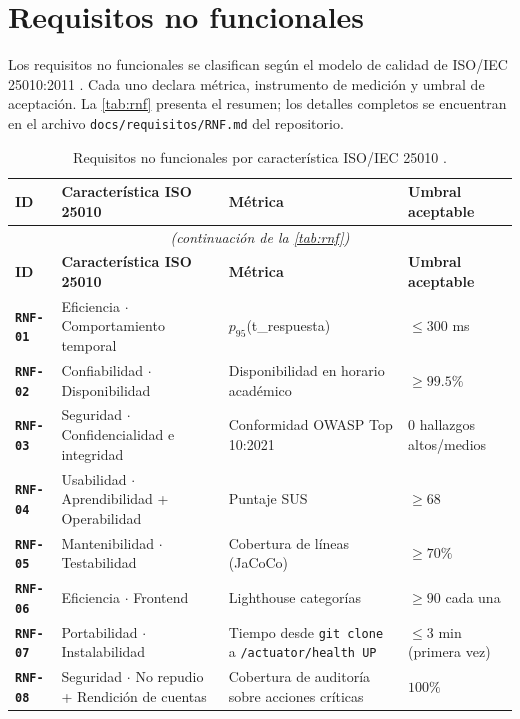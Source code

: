 \documentclass[11pt,a4paper,twoside]{report}
\newcommand{\reqid}[1]{\texttt{\textbf{#1}}}
\begin{document}
\section{Requisitos no funcionales}
\label{sec:rnf}

Los requisitos no funcionales se clasifican seg\'un el modelo de calidad de ISO/IEC 25010:2011 \cite{iso25010}. Cada uno declara m\'etrica, instrumento de medici\'on y umbral de aceptaci\'on. La \cref{tab:rnf} presenta el resumen; los detalles completos se encuentran en el archivo \texttt{docs/requisitos/RNF.md} del repositorio.

\begin{longtable}{@{}p{1.2cm}p{4.5cm}p{5.5cm}p{3.5cm}@{}}
    \caption{Requisitos no funcionales por caracter\'istica ISO/IEC 25010 \cite{iso25010}.}
    \label{tab:rnf}\\
    \toprule
    \textbf{ID} & \textbf{Caracter\'istica ISO 25010} & \textbf{M\'etrica} & \textbf{Umbral aceptable} \\
    \midrule
    \endfirsthead
    \multicolumn{4}{c}{\itshape (continuaci\'on de la \cref{tab:rnf})}\\
    \toprule
    \textbf{ID} & \textbf{Caracter\'istica ISO 25010} & \textbf{M\'etrica} & \textbf{Umbral aceptable} \\
    \midrule
    \endhead

    \reqid{RNF-01}\label{rnf:01} & Eficiencia $\cdot$ Comportamiento temporal & $p_{95}$(t\_respuesta) & $\leq 300$ ms \\
    \reqid{RNF-02}\label{rnf:02} & Confiabilidad $\cdot$ Disponibilidad & Disponibilidad en horario acad\'emico & $\geq 99.5\%$ \\
    \reqid{RNF-03}\label{rnf:03} & Seguridad $\cdot$ Confidencialidad e integridad & Conformidad OWASP Top 10:2021 \cite{owasp2021top10} & 0 hallazgos altos/medios \\
    \reqid{RNF-04}\label{rnf:04} & Usabilidad $\cdot$ Aprendibilidad + Operabilidad & Puntaje SUS \cite{brooke1996sus} & $\geq 68$ \\
    \reqid{RNF-05}\label{rnf:05} & Mantenibilidad $\cdot$ Testabilidad & Cobertura de l\'ineas (JaCoCo) & $\geq 70\%$ \\
    \reqid{RNF-06}\label{rnf:06} & Eficiencia $\cdot$ Frontend & Lighthouse categor\'ias & $\geq 90$ cada una \\
    \reqid{RNF-07}\label{rnf:07} & Portabilidad $\cdot$ Instalabilidad & Tiempo desde \texttt{git clone} a \texttt{/actuator/health UP} & $\leq 3$ min (primera vez) \\
    \reqid{RNF-08}\label{rnf:08} & Seguridad $\cdot$ No repudio + Rendici\'on de cuentas & Cobertura de auditor\'ia sobre acciones cr\'iticas & $100\%$ \\
    \bottomrule
\end{longtable}
\end{document}
